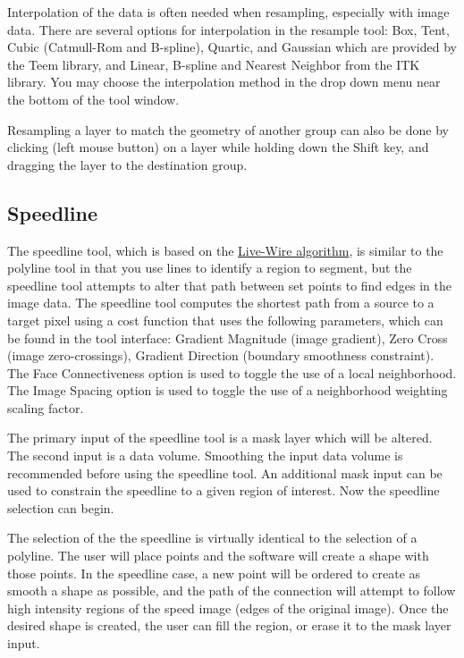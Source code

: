\documentclass[fleqn,11pt,openany]{book}
\begin{document}
Interpolation of the data is often needed when resampling, especially with image data. There are several options for interpolation in the resample tool: Box, Tent, Cubic (Catmull-Rom and B-spline), Quartic, and Gaussian which are provided by the Teem library, and Linear, B-spline and Nearest Neighbor from the ITK library. You may choose the interpolation method in the drop down menu near the bottom of the tool window.

Resampling a layer to match the geometry of another group can also be done by clicking (left mouse button) on a layer while holding down the Shift key, and dragging the layer to the destination group.

\subsection{Speedline}

The speedline tool, which is based on the \href{http://www.insight-journal.org/browse/publication/230}{Live-Wire algorithm}, is similar to the polyline tool in that you use lines to identify a region to segment, but the speedline tool attempts to alter that path between set points to find edges in the image data. The speedline tool computes the shortest path from a source to a target pixel using a cost function that uses the following parameters, which can be found in the tool interface: Gradient Magnitude (image gradient), Zero Cross (image zero-crossings), Gradient Direction (boundary smoothness constraint). The Face Connectiveness option is used to toggle the use of a local neighborhood. The Image Spacing option is used to toggle the use of a neighborhood weighting scaling factor.

The primary input of the speedline tool is a mask layer which will be altered. The second input is a data volume. Smoothing the input data volume is recommended before using the speedline tool. An additional mask input can be used to constrain the speedline to a given region of interest. Now the speedline selection can begin.

The selection of the the speedline is virtually identical to the selection of a polyline. The user will place points and the software will create a shape with those points.  In the speedline case, a new point will be ordered to create as smooth a shape as possible, and the path of the connection will attempt to follow high intensity regions of the speed image (edges of the original image). Once the desired shape is created, the user can fill the region, or erase it to the mask layer input.
\end{document}
